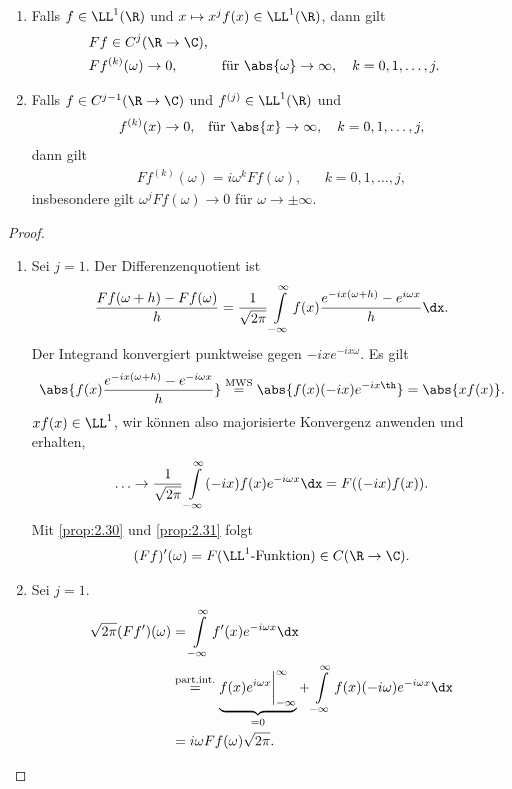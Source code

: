 \begin{prop}
\label{prop:2.33}
\begin{enumerate}[label=\arabic{*}.)]
  \item Falls $f\in\LL^1(\R)$ und $x\mapsto x^j f(x)\in\LL^1(\R)$, dann gilt
\begin{align*}
&Ff \in C^j(\R\to\C),\\
&Ff^{(k)}(\omega) \to 0,&& \text{für }\abs{\omega}\to\infty,\quad
k=0,1,\ldots,j.
\end{align*}
\item Falls $f\in C^{j-1}(\R\to\C)$ und $f^{(j)}\in\LL^1(\R)$ und
\begin{align*}
f^{(k)}(x)\to 0,&& \text{für } \abs{x}\to\infty,\quad k=0,1,\ldots,j,
\end{align*}
dann gilt
\begin{align*}
Ff^{(k)}(\omega) = i\omega^k Ff(\omega),&& k=0,1,\ldots,j,
\end{align*}
insbesondere gilt $\omega^j Ff(\omega)\to 0$ für $\omega\to\pm\infty$.\fishhere
\end{enumerate}
\end{prop}
\begin{proof}
\begin{enumerate}[label=\arabic{*}.)]
  \item Sei $j=1$. Der Differenzenquotient ist
\begin{align*}
\frac{Ff(\omega+h)-Ff(\omega)}{h} =
\frac{1}{\sqrt{2\pi}}\int\limits_{-\infty}^\infty
f(x)\frac{e^{-ix(\omega+h)}-e^{i\omega x}}{h}\dx.
\end{align*}
Der Integrand konvergiert punktweise gegen $-ixe^{-ix\omega}$. Es gilt
\begin{align*}
\abs{f(x)\frac{e^{-ix(\omega+h)}-e^{-i\omega x}}{h}}
\overset{\text{MWS}}{=}
\abs{f(x)(-ix)e^{-ix\th}} = \abs{x f(x)}.
\end{align*}
$xf(x)\in\LL^1$, wir können also majorisierte Konvergenz anwenden und
erhalten,
\begin{align*}
\ldots \to \frac{1}{\sqrt{2\pi}}\int\limits_{-\infty}^\infty
(-ix)f(x)e^{-i\omega x}\dx = F((-ix)f(x)).
\end{align*}
Mit \ref{prop:2.30} und \ref{prop:2.31} folgt
\begin{align*}
(Ff)'(\omega) = F(\LL^1\text{-Funktion}) \in C(\R\to\C). 
\end{align*}
\item Sei $j=1$.
\begin{align*}
\sqrt{2\pi} (Ff')(\omega) &= \int\limits_{-\infty}^\infty f'(x)e^{-i\omega x}\dx
\\ &\overset{\small\text{part.int.}}{=} \underbrace{f(x)e^{i\omega
x}\bigg|_{-\infty}^\infty}_{=0} + \int\limits_{-\infty}^\infty
f(x)(-i\omega)e^{-i\omega x}\dx \\ &= i\omega Ff(\omega)\sqrt{2\pi}.\qedhere
\end{align*}
\end{enumerate}
\end{proof}

